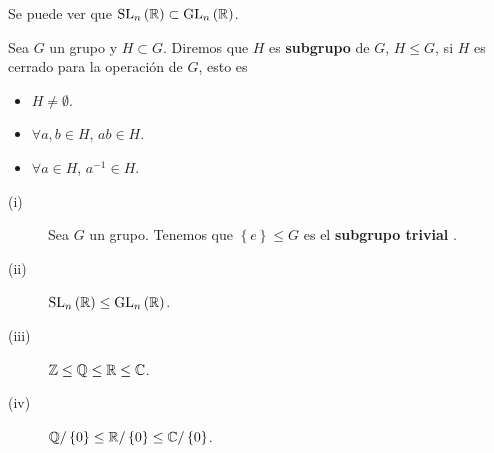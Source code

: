 \begin{observation}
Se puede ver que $\displaystyle \operatorname{SL}_{n}\left(\mathbb{R}\right) \subset \operatorname{GL}_{n}\left(\mathbb{R}\right) $. 
\end{observation}
\begin{definition}[Subgrupo]
Sea $\displaystyle G $ un grupo y $\displaystyle H \subset G $. Diremos que $\displaystyle H $ es \textbf{subgrupo} de $\displaystyle G $, $\displaystyle H \leq G $, si $\displaystyle H $ es cerrado para la operación de $\displaystyle G $, esto es
\begin{itemize}
\item $\displaystyle H \neq \emptyset $.
\item $\displaystyle \forall a,b \in H $, $\displaystyle ab \in H $.
\item $\displaystyle \forall a \in H $, $\displaystyle a^{-1} \in H $.
\end{itemize}
\end{definition}
\begin{eg}
\begin{description}
	\item[(i)] Sea $\displaystyle G $ un grupo. Tenemos que $\displaystyle \left\{ e\right\} \leq G $ es el \textbf{subgrupo trivial} .
	\item[(ii)] $\displaystyle \operatorname{SL}_{n}\left(\mathbb{R}\right) \leq \operatorname{GL}_{n}\left(\mathbb{R}\right) $.
	\item[(iii)] $\displaystyle \mathbb{Z} \leq \mathbb{Q} \leq \mathbb{R} \leq \mathbb{C} $.
	\item[(iv)] $\displaystyle \mathbb{Q}/ \left\{ 0\right\}  \leq \mathbb{R}/ \left\{ 0\right\}  \leq \mathbb{C} / \left\{ 0\right\}  $.
\end{description}
\end{eg}

